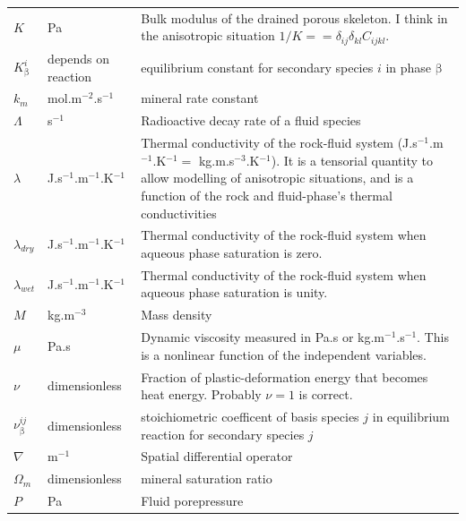 \documentclass[12pt]{report}
\def\phase{\mathrm{\beta}}
\begin{document}
\begin{longtable}{llp{10cm}}
$K$ & Pa & Bulk modulus of the drained porous skeleton.  I think in
the anisotropic situation $1/K = = \delta_{ij}\delta_{kl}C_{ijkl}$. \\

$K_{\phase}^{i}$ & depends on reaction & equilibrium constant for secondary species $i$ in
phase $\phase$ \\

$k_{m}$ & mol.m$^{-2}$.s$^{-1}$ & mineral rate constant \\

$\Lambda$ & s$^{-1}$ & Radioactive decay rate of a fluid species \\

$\lambda$ & J.s$^{-1}$.m$^{-1}$.K$^{-1}$ & Thermal conductivity of
the rock-fluid system (J.s$^{-1}$.m$^{-1}$.K$^{-1} =$
kg.m.s$^{-3}$.K$^{-1}$).  It is a tensorial quantity to allow
modelling of anisotropic situations, and is a function of the
rock and fluid-phase's thermal conductivities\\

$\lambda_{dry}$ & J.s$^{-1}$.m$^{-1}$.K$^{-1}$ & Thermal conductivity of
the rock-fluid system when aqueous phase saturation is zero. \\

$\lambda_{wet}$ & J.s$^{-1}$.m$^{-1}$.K$^{-1}$ & Thermal conductivity of
the rock-fluid system when aqueous phase saturation is unity. \\

$M$ & kg.m$^{-3}$ & Mass density \\

$\mu$ & Pa.s & Dynamic viscosity measured in Pa.s or
kg.m$^{-1}$.s$^{-1}$.  This is a nonlinear function of the independent
variables. \\

$\nu$ & dimensionless & Fraction of plastic-deformation energy that
becomes heat energy.  Probably $\nu=1$ is correct. \\

$\nu^{ij}_{\phase}$ & dimensionless & stoichiometric coefficent of
basis species $j$ in equilibrium reaction for secondary species $j$ \\

$\nabla$ & m$^{-1}$ & Spatial differential operator \\

$\Omega_{m}$ & dimensionless & mineral saturation ratio \\


$P$ & Pa & Fluid porepressure \\


\end{longtable}
\end{document}
